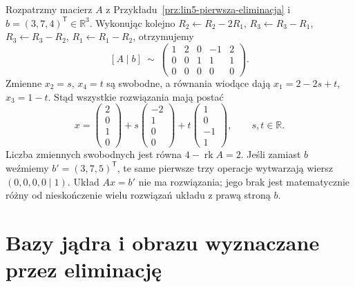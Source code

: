 \begin{przyklad}
\label{prz:lin5-uklad-rozszerzony}
Rozpatrzmy macierz \(A\) z
Przykładu~\ref{prz:lin5-pierwsza-eliminacja}
i \(b=(3,7,4)^{\mathsf T}\in\mathbb R^3\).
Wykonując kolejno
\(R_2\leftarrow R_2-2R_1\),
\(R_3\leftarrow R_3-R_1\),
\(R_3\leftarrow R_3-R_2\),
\(R_1\leftarrow R_1-R_2\), otrzymujemy
\[
 [A\mid b]\ \sim\
 \left(\begin{array}{rrrr|r}
 1&2&0&-1&2\\
 0&0&1& 1&1\\
 0&0&0& 0&0
 \end{array}\right).
\]
Zmienne \(x_2=s\), \(x_4=t\) są swobodne,
a równania wiodące dają
\(x_1=2-2s+t\), \(x_3=1-t\).
Stąd wszystkie rozwiązania mają postać
\[
 x=\begin{pmatrix}2\\0\\1\\0\end{pmatrix}
 +s\begin{pmatrix}-2\\1\\0\\0\end{pmatrix}
 +t\begin{pmatrix}1\\0\\-1\\1\end{pmatrix},
 \qquad s,t\in\mathbb R.
\]
Liczba zmiennych swobodnych jest równa
\(4-\operatorname{rk}A=2\).
Jeśli zamiast \(b\) weźmiemy
\(b'=(3,7,5)^{\mathsf T}\),
te same pierwsze trzy operacje wytwarzają
wiersz \((0,0,0,0\mid1)\).
Układ \(Ax=b'\) nie ma rozwiązania;
jego brak jest matematycznie różny
od nieskończenie wielu rozwiązań układu
z prawą stroną \(b\).
\end{przyklad}

\section{Bazy jądra i obrazu wyznaczane przez eliminację}
\label{sec:lin5-bazy}

